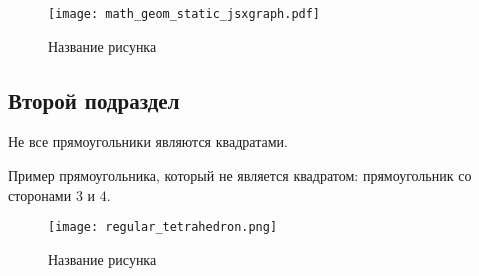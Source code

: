 \begin{figure}[h]
    \centering
    \texttt{[image: math\_geom\_static\_jsxgraph.pdf]}
    \caption{Название рисунка}
\end{figure}


\subsection{Второй подраздел}

\begin{remark}
Не все прямоугольники являются квадратами.
\end{remark}

\begin{example}
Пример прямоугольника, который не является квадратом: прямоугольник со сторонами $3$ и $4$.
\end{example}

\begin{figure}[h]
    \centering
    \texttt{[image: regular\_tetrahedron.png]}
    \caption{Название рисунка}
\end{figure}
